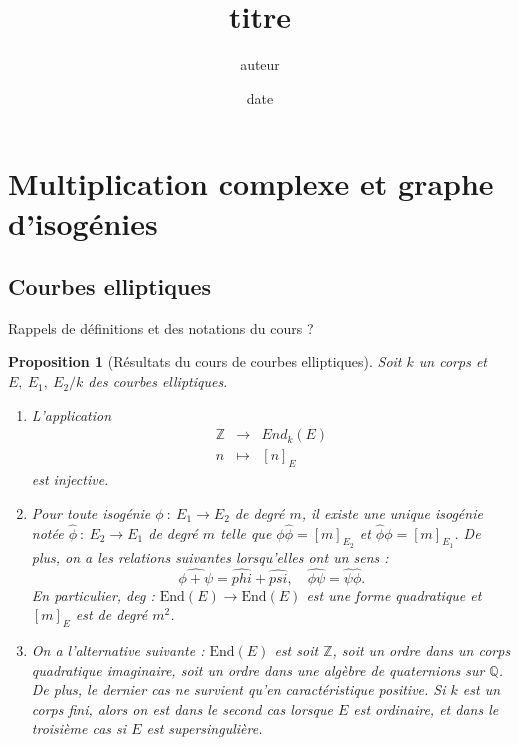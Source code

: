 \documentclass[11pt,a4paper]{article}
\title{titre}
\author{auteur}
\date{date}
\newcommand{\Z}{\mathbb{Z}}
\newcommand{\Q}{\mathbb{Q}}
\newcommand{\vers}{\rightarrow}
\newcommand{\End}{\mathrm{End}}
\newtheorem{prop}[thm]{Proposition}
\theoremstyle{definition}
\begin{document}
\maketitle

\newpage

\tableofcontents

\newpage

\section{Multiplication complexe et graphe d'isogénies}

\subsection{Courbes elliptiques}

Rappels de définitions et des notations du cours ?

\begin{prop}[Résultats du cours de courbes elliptiques]
Soit $k$ un corps et $E,\ E_1,\ E_2/k$ des courbes elliptiques. 
\begin{enumerate}

\item L'application
$$\begin{aligned}
\Z &\vers &End_k(E) \\
n &\mapsto &[n]_E
\end{aligned}$$
est injective.

\item Pour toute isogénie $\phi\ :\ E_1\vers E_2$ de degré $m$, il existe une unique isogénie notée $\hat{\phi}\ :\ E_2\vers E_1$ de degré $m$ telle que $\phi\hat{\phi}=[m]_{E_2}$ et $\hat{\phi}\phi=[m]_{E_1}$.
De plus, on a les relations suivantes lorsqu'elles ont un sens :
$$\hat{\phi+\psi}=\hat{phi}+\hat{psi},\quad \hat{\phi\psi}=\hat{\psi}\hat{\phi}.$$
En particulier, deg : $\End(E)\vers \End(E)$ est une forme quadratique et $[m]_E$ est de degré $m^2$.

\item On a l'alternative suivante : $\End(E)$ est soit $\Z$, soit un ordre dans un corps quadratique imaginaire, soit un ordre dans une algèbre de quaternions sur $\Q$. De plus, le dernier cas ne survient qu'en caractéristique positive. Si $k$ est un corps fini, alors on est dans le second cas lorsque $E$ est ordinaire, et dans le troisième cas si $E$ est supersingulière.

\end{enumerate}
\end{prop}
\end{document}

